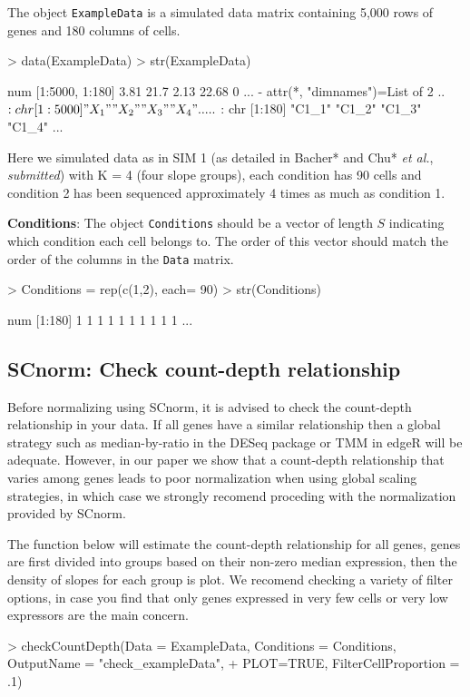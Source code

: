 \documentclass{article}
\begin{document}
\noindent The object \verb+ExampleData+ is a simulated data matrix containing
5,000 rows of genes and 180 columns of cells. 

\begin{Schunk}
\begin{Sinput}
> data(ExampleData)
> str(ExampleData)
\end{Sinput}
\begin{Soutput}
 num [1:5000, 1:180] 3.81 21.7 2.13 22.68 0 ...
 - attr(*, "dimnames")=List of 2
  ..$ : chr [1:5000] "X_1" "X_2" "X_3" "X_4" ...
  ..$ : chr [1:180] "C1_1" "C1_2" "C1_3" "C1_4" ...
\end{Soutput}
\end{Schunk}
  
  Here we simulated data as in SIM 1 (as detailed in Bacher* and Chu* {\it et al.}, {\it{submitted}}) with K = 4 (four slope groups), each condition has 90 cells and condition 2 has been 
sequenced approximately 4 times as much as condition 1.

{\bf Conditions}: The object \verb+Conditions+ should be a vector of length $S$ indicating which condition each cell belongs to. The order of this vector should match the order of the columns in the \verb+Data+ matrix.
\begin{Schunk}
\begin{Sinput}
> Conditions = rep(c(1,2), each= 90)
> str(Conditions)
\end{Sinput}
\begin{Soutput}
 num [1:180] 1 1 1 1 1 1 1 1 1 1 ...
\end{Soutput}
\end{Schunk}
  
  
  
  \subsection{SCnorm: Check count-depth relationship}
\label{sec:checkData}
Before normalizing using SCnorm, it is advised to check the count-depth relationship in your data. If all genes have a similar relationship then a global strategy such as median-by-ratio in the DESeq package or TMM in edgeR will be adequate. However, in our paper we show that a count-depth relationship that varies among genes leads to poor normalization when using global scaling strategies, in which case we strongly recomend proceding with the normalization provided by SCnorm. 

The function below will estimate the count-depth relationship for all genes, genes are first divided into groups based on their non-zero median expression, then the density of slopes for each group is plot. We recomend checking a variety of filter options, in case you find that only genes expressed in very few cells or very low expressors are the main concern.
\begin{Schunk}
\begin{Sinput}
> checkCountDepth(Data = ExampleData, Conditions = Conditions, OutputName = "check_exampleData", 
+                 PLOT=TRUE, FilterCellProportion = .1)
\end{Sinput}
\end{Schunk}
  
\end{document}
